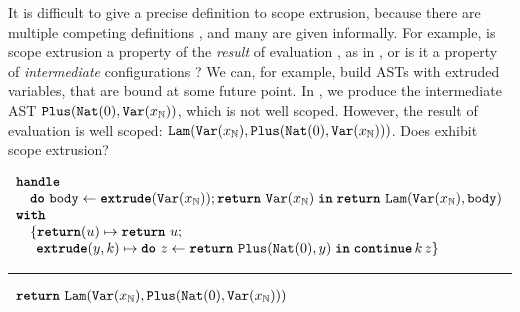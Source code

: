 It is difficult to give a precise definition to scope extrusion, because there are multiple competing definitions \citep{kiselyov-14,kiselyov-16}, and many are given informally. For example, is scope extrusion a property of the \textit{result} of evaluation \citep{kiselyov-16}, as in , or is it a property of \textit{intermediate} configurations \citep{kiselyov-14}? We can, for example, build ASTs with extruded variables, that are bound at some future point. In , we produce the intermediate AST $\texttt{Plus}(\texttt{Nat}({0}), \texttt{Var}(x_{\mathbb{N}}))$, which is not well scoped. However, the result of evaluation is well scoped: $\texttt{Lam}(\texttt{Var}(x_{\mathbb{N}}), \texttt{Plus}(\texttt{Nat}({0}), \texttt{Var}(x_{\mathbb{N}})))$. Does  exhibit scope extrusion?


\begin{code}
  \begin{efflst}
    $\begin{array}{l}
      \textbf{\texttt{handle}} \\
      \quad \texttt{\textbf{do}} \,\, {\texttt{body}} \leftarrow {\textbf{\texttt{extrude}}({\texttt{Var}(x_{\mathbb{N}})}); \texttt{\textbf{return}} \,\, {\texttt{Var}(x_{\mathbb{N}})}} \; \textbf{\texttt{in}} \; {\texttt{\textbf{return}} \,\, {\texttt{Lam}(\texttt{Var}(x_{\mathbb{N}}), \texttt{body})}} \\
      \textbf{\texttt{with}} \\
      \quad \{ \textbf{\texttt{return}}(u) \mapsto \texttt{\textbf{return}} \,\, {u}; \\
      \quad \; \, \textbf{\texttt{extrude}}(y, k) \mapsto { \texttt{\textbf{do}} \,\, {z} \leftarrow {\texttt{\textbf{return}} \,\, {\texttt{Plus}({\texttt{Nat}({0})}, y)}} \; \textbf{\texttt{in}} \; {\textbf{\texttt{continue}} \, {k} \, {z}}} \}\\
    \end{array}$

    \vspace{2mm} 
\textcolor{effComment}{\hrule height 0.2mm \relax}
\vspace{2mm} 

\textcolor{effComment}{$\begin{array}{l}\texttt{\textbf{return}} \,\, {\texttt{Lam}(\texttt{Var}(x_{\mathbb{N}}), \texttt{Plus}(\texttt{Nat}({0}), \texttt{Var}(x_{\mathbb{N}})))}\end{array}$}

\end{efflst}
%
\label{listing:efflang-maybe-scope-extrusion}
\end{code}

